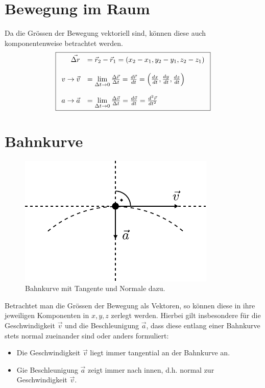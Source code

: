 \section{Bewegung im Raum}
Da die Grössen der Bewegung vektoriell sind, können diese auch 
komponentenweise betrachtet werden.
\[ \boxed{\begin{array}{r l}
	\vec{\Delta r} &
		= \vec{r}_2-\vec{r}_1
		= (x_2-x_1,y_2-y_1,z_2-z_1) \\
	& \\
	v \rightarrow \vec{v} &
		= \lim\limits_{\Delta t \rightarrow 0}
			{\frac{\Delta \vec{r}}{\Delta t}}
		= \frac{d\vec{r}}{dt}
		= \left(\frac{dx}{dt},\frac{dy}{dt},\frac{dz}{dt}\right) \\
	& \\
	a \rightarrow \vec{a} &
		= \lim\limits_{\Delta t \rightarrow 0}
			{\frac{\Delta \vec{v}}{\Delta t}}
		= \frac{d\vec{v}}{dt}
		= \frac{d^2\vec{r}}{dt^2}
\end{array}}\]
		
\section{Bahnkurve}

\begin{figure}[h!]
	\centering
	\includegraphics[scale=0.8]{bahnkurve.pdf}
	\caption{Bahnkurve mit Tangente und Normale dazu.}
	\label{fig:bahnkurve}
\end{figure}

\noindent
Betrachtet man die Grössen der Bewegung als Vektoren, so können diese 
in ihre jeweiligen Komponenten in $x,y,z$ zerlegt werden. Hierbei gilt 
insbesondere für die Geschwindigkeit $\vec{v}$ und die Beschleunigung
$\vec{a}$, dass diese entlang einer Bahnkurve stets normal zueinander 
sind oder anders formuliert:

\begin{itemize}
	\item Die Geschwindigkeit $\vec{v}$ liegt immer tangential an
		der Bahnkurve an.
	\item Gie Beschleunigung $\vec{a}$ zeigt immer nach innen, 
		d.h. normal zur Geschwindigkeit $\vec{v}$.
\end{itemize}

